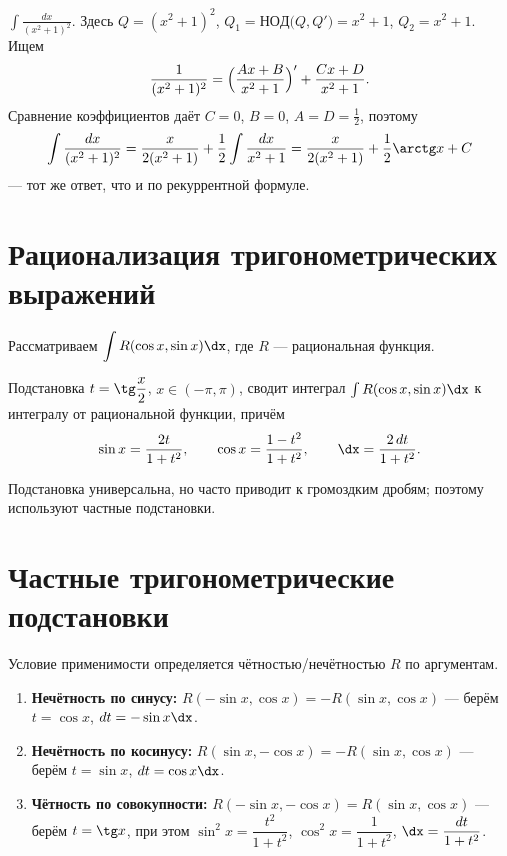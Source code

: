\begin{example}
$\displaystyle\int\frac{dx}{(x^2+1)^2}$. Здесь $Q=(x^2+1)^2$, $Q_1=\mathrm{НОД}\bigl(Q,Q'\bigr)=x^2+1$,
$Q_2=x^2+1$. Ищем
\[
  \frac{1}{(x^2+1)^2}=\Bigl(\frac{Ax+B}{x^2+1}\Bigr)'+\frac{Cx+D}{x^2+1}.
\]
Сравнение коэффициентов даёт $C=0$, $B=0$, $A=D=\tfrac12$, поэтому
\[
  \int\frac{dx}{(x^2+1)^2}=\frac{x}{2(x^2+1)}+\frac12\int\frac{dx}{x^2+1}
   =\frac{x}{2(x^2+1)}+\frac12\arctg x+C
\]
— тот же ответ, что и по рекуррентной формуле.
\end{example}

\section{Рационализация тригонометрических выражений}

Рассматриваем $\displaystyle\int R(\cos x,\sin x)\dx$, где $R$ — рациональная функция.

\begin{theorem}
Подстановка $t=\tg\dfrac x2$, $x\in(-\pi,\pi)$, сводит интеграл $\int R(\cos x,\sin x)\dx$ к
интегралу от рациональной функции, причём
\[
  \sin x=\frac{2t}{1+t^2},\qquad \cos x=\frac{1-t^2}{1+t^2},\qquad \dx=\frac{2\,dt}{1+t^2}.
\]
\end{theorem}

Подстановка универсальна, но часто приводит к громоздким дробям; поэтому используют частные
подстановки.

\section{Частные тригонометрические подстановки}

Условие применимости определяется чётностью/нечётностью $R$ по аргументам.
\begin{enumerate}[label=\arabic*),leftmargin=*]
  \item \textbf{Нечётность по синусу:} $R(-\sin x,\cos x)=-R(\sin x,\cos x)$ — берём $t=\cos x$,
        $dt=-\sin x\dx$.
  \item \textbf{Нечётность по косинусу:} $R(\sin x,-\cos x)=-R(\sin x,\cos x)$ — берём $t=\sin x$,
        $dt=\cos x\dx$.
  \item \textbf{Чётность по совокупности:} $R(-\sin x,-\cos x)=R(\sin x,\cos x)$ — берём $t=\tg x$,
        при этом $\sin^2 x=\dfrac{t^2}{1+t^2}$, $\cos^2 x=\dfrac{1}{1+t^2}$, $\dx=\dfrac{dt}{1+t^2}$.
\end{enumerate}

